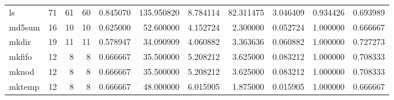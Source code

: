 \begin{tabular}{lrrrrrrrrrr}
ls        &                                      71 &                 61 &                                60 &                                   0.845070 &                             135.950820 &                                     8.784114 &                         82.311475 &                                3.046409 &                           0.934426 &                                           0.693989 \\
md5sum    &                                      16 &                 10 &                                10 &                                   0.625000 &                              52.600000 &                                     4.152724 &                          2.300000 &                                0.052724 &                           1.000000 &                                           0.666667 \\
mkdir     &                                      19 &                 11 &                                11 &                                   0.578947 &                              34.090909 &                                     4.060882 &                          3.363636 &                                0.060882 &                           1.000000 &                                           0.727273 \\
mkfifo    &                                      12 &                  8 &                                 8 &                                   0.666667 &                              35.500000 &                                     5.208212 &                          3.625000 &                                0.083212 &                           1.000000 &                                           0.708333 \\
mknod     &                                      12 &                  8 &                                 8 &                                   0.666667 &                              35.500000 &                                     5.208212 &                          3.625000 &                                0.083212 &                           1.000000 &                                           0.708333 \\
mktemp    &                                      12 &                  8 &                                 8 &                                   0.666667 &                              48.000000 &                                     6.015905 &                          1.875000 &                                0.015905 &                           1.000000 &                                           0.666667 \\

\end{tabular}
